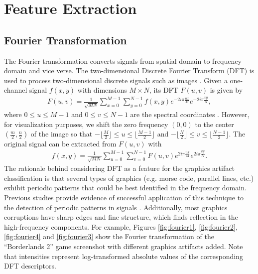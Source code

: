 \chapter{Feature Extraction}\label{Ch:feature}
% 



\section{Fourier Transformation}
The Fourier transformation converts signals from spatial domain to frequency domain and vice verse. The two-dimensional Discrete Fourier Transform (DFT) is used to process two-dimensional discrete signals such as images \cite{Cooley}. Given a one-channel signal $f(x,y)$ with dimensions $M\times N$, its DFT $F(u,v)$ is given by
\begin{align}
F(u,v)=\frac{1}{\sqrt{MN}}\sum\limits_{x=0}^{M-1}\sum\limits_{y=0}^{N-1}f(x,y)e^{-2i\pi\frac{ux}{M}}e^{-2i\pi \frac{vy}{N}},
\end{align}
where $0\leqslant u\leqslant M-1$ and $0\leqslant v\leqslant N-1$ are the spectral coordinates \cite{Burger}. However, for visualization purposes, we shift the zero frequency $(0,0)$ to the center $(\frac{m}{2},\frac{n}{2})$ of the image so that $-\lfloor\frac{M}{2}\rfloor\leqslant u\leqslant \lfloor\frac{M-1}{2}\rfloor$ and $-\lfloor\frac{N}{2}\rfloor\leqslant v\leqslant \lfloor\frac{N-1}{2}\rfloor$. The original signal can be extracted from $F(u,v)$ with
\begin{align}
f(x,y)=\frac{1}{\sqrt{MN}}\sum\limits_{u=0}^{M-1}\sum\limits_{v=0}^{N-1}F(u,v)e^{2i\pi\frac{ux}{M}}e^{2i\pi \frac{vy}{N}}.
\end{align}
The rationale behind considering DFT as a feature for the graphics artifact classification is that several types of graphics (e.g. morse code, parallel lines, etc.) exhibit periodic patterns that could be best identified in the frequency domain. Previous studies provide evidence of successful application of this technique to the detection of periodic patterns in signals \cite{russians}. Additionally, most graphics corruptions have sharp edges and fine structure, which finds reflection in the high-frequency components. For example, Figures \ref{fig:fourier1}, \ref{fig:fourier2}, \ref{fig:fourier4} and \ref{fig:fourier3} show the Fourier transformation of the ``Borderlands 2'' game screenshot with different graphics artifacts added. Note that intensities represent log-transformed absolute values of the corresponding DFT descriptors.
